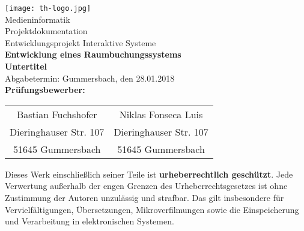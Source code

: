 \begin{titlepage}

\begin{center}
\texttt{[image: th-logo.jpg]}\\[1ex]
\Large{Medieninformatik}\\[3ex]

\Large{Projektdokumentation}\\
\LARGE{Entwicklungsprojekt Interaktive Systeme}\\[4ex]

\huge{\textbf{Entwicklung eines Raumbuchungssystems}}\\[1.5ex]
\Large{\textbf{Untertitel}}\\[4ex]

\normalsize
Abgabetermin: Gummersbach, den 28.01.2018\\[3em]
\textbf{Prüfungsbewerber:}\\
\begin{tabular}{cc}
	Bastian Fuchshofer & Niklas Fonseca Luis\\
	Dieringhauser Str. 107 & Dieringhauser Str. 107\\
	51645 Gummersbach & 51645 Gummersbach\\[5ex]
\end{tabular}

\end{center}

\small
\noindent
Dieses Werk einschließlich seiner Teile ist \textbf{urheberrechtlich geschützt}.
Jede Verwertung außerhalb der engen Grenzen des Urheberrechtsgesetzes ist ohne
Zustimmung der Autoren unzulässig und strafbar. Das gilt insbesondere für 
Vervielfältigungen, Übersetzungen, Mikroverfilmungen sowie die Einspeicherung
und Verarbeitung in elektronischen Systemen.

\end{titlepage}
